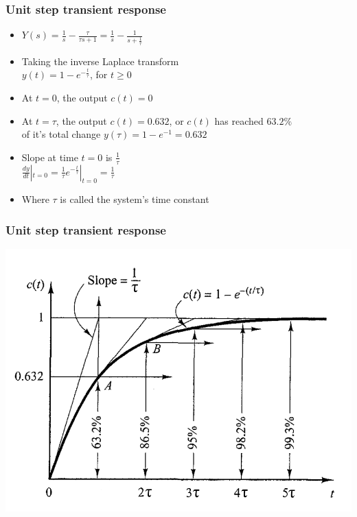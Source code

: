 \begin{frame}
\frametitle{Unit step transient response}
\begin{itemize}
\item$Y(s)= \frac{1}{s} - \frac{\tau}{\tau s +1} = \frac{1}{s} - \frac{1}{s+\frac{1}{\tau}}$
\vspace{0.25cm}
\item Taking the inverse Laplace transform
\vspace{0.25cm}
\\ $y(t) = 1 - e^{-\frac{t}{\tau}}$, for $t\ge 0$ 
\vspace{0.25cm}
\item At $t=0$, the output $c(t)=0$
\vspace{0.25cm}
\item At $t=\tau$, the output $c(t)=0.632$, or $c(t)$ has reached $63.2\% $ 
\vspace{0.25cm} \\of it's total change $y(\tau)= 1 - e^{-1} = 0.632$
\vspace{0.25cm}
\item Slope at time $t=0$ is $\frac{1}{\tau}$
\vspace{0.25cm}
\\ $\frac{dy}{dt}|_{t=0} = \frac{1}{\tau}e^{-\frac{t}{\tau}}|_{t=0} = \frac{1}{\tau}$
\vspace{0.25cm}
\item Where $\tau$ is called the system's time constant
\end{itemize}
\end{frame}

\begin{frame}
\frametitle{Unit step transient response}
\includegraphics[width=1\linewidth]{Afbeelding2}
\end{frame}

